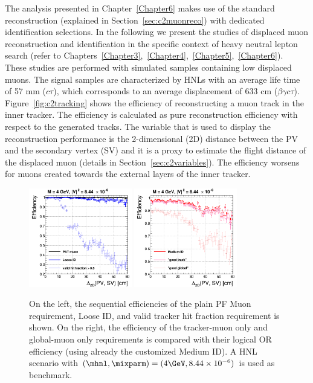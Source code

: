 The analysis presented in Chapter~\ref{Chapter6} makes use of the
standard reconstruction (explained in
Section~\ref{sec:c2muonreco}) with dedicated identification selections.
In the following we present the studies of displaced muon
reconstruction and identification in the specific context of heavy
neutral lepton search (refer to
Chapters~\ref{Chapter3},~\ref{Chapter4},~\ref{Chapter5},~\ref{Chapter6}).\\
These studies are performed with simulated samples containing
 low \pt displaced muons. 
The signal samples are characterized by HNLs with an
average life time of 57 mm ($c\tau$), which corresponds to an average
displacement of 633 cm ($\beta \gamma c \tau$).\\
Figure~\ref{fig:c2tracking} shows the efficiency of
reconstructing a muon track in the inner tracker. The efficiency is
calculated as pure reconstruction efficiency with respect to the
generated tracks. The variable that is used to display the reconstruction
performance is the 2-dimensional (2D) distance between the PV and the secondary vertex (SV)
and it is a proxy to estimate the flight distance of the
displaced muon (details in Section~\ref{sec:c2variables}). The efficiency worsens for muons created towards the external layers of the inner
tracker.
\begin{figure}[h!]
\centering
  \includegraphics[width=0.4\textwidth]{Figures/c6/object/loose_validFraction_M-4_V-0p00290516780927_rho.png}
  \includegraphics[width=0.4\textwidth]{Figures/c6/object/goodTrack_goodGlobal_M-4_V-0p00290516780927_rho.png}
  \caption{On the left, the sequential
efficiencies of the plain PF Muon requirement, Loose ID, and
valid tracker hit fraction requirement is shown. On the right, the efficiency of the tracker-muon only and
    global-muon only requirements is compared with their logical OR
    efficiency (using already the customized Medium ID). A HNL scenario with
    $(\mhnl,\mixparm)=(4\GeV,8.44\times10^{-6})$ is used as
    benchmark. \dani}
  \label{fig:c2tracking2}
\end{figure}

